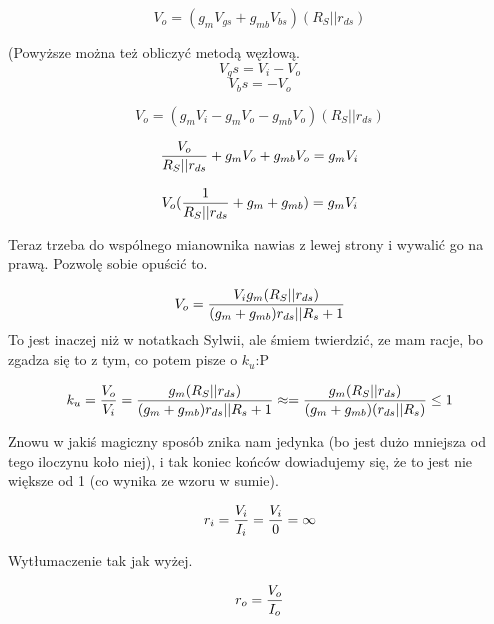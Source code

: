 \documentclass[10pt,a4paper]{article}
\begin{document}
\begin{equation}
V_o = {(g_mV_{gs} + g_{mb}V_{bs})(R_S || r_{ds})}
\end{equation}

(Powyższe można też obliczyć metodą węzłową.
\begin{equation}
V_gs = V_i - V_o
\end{equation}
\begin{equation}
V_bs = - V_o
\end{equation}

\begin{equation}
V_o = {(g_mV_i - g_mV_o - g_{mb}V_{o})(R_S || r_{ds})}
\end{equation}

\begin{equation}
{V_o \over R_S || r_{ds}} + g_mV_o + g_{mb}V_{o}= {g_mV_i }
\end{equation}

\begin{equation}
{V_o ({1\over R_S || r_{ds}} + g_m + g_{mb})= g_mV_i }
\end{equation}

Teraz trzeba do wspólnego mianownika nawias z lewej strony i wywalić go na prawą. Pozwolę sobie opuścić to. 

\begin{equation}
V_o = {V_ig_m(R_S || r_{ds}) \over (g_m + g_{mb})r_{ds}||R_s + 1}
\end{equation}
To jest inaczej niż w notatkach Sylwii, ale śmiem twierdzić, ze mam racje, bo zgadza się to z tym, co potem pisze o $k_u$:P

\begin{equation}
k_u = {V_o \over V_i} = {g_m(R_S || r_{ds}) \over (g_m + g_{mb})r_{ds}||R_s + 1} \approx = {g_m(R_S || r_{ds}) \over (g_m + g_{mb})(r_{ds}||R_s)} \leq 1
\end{equation}

Znowu w jakiś magiczny sposób znika nam jedynka (bo jest dużo mniejsza od tego iloczynu koło niej), i tak koniec końców dowiadujemy się, że to jest nie większe od 1 (co wynika ze wzoru w sumie).

\begin{equation}
r_i = {V_i \over I_i} = {V_i \over 0} = \infty
\end{equation}

Wytłumaczenie tak jak wyżej. 

\begin{equation}
r_o = {V_o \over I_o}
\end{equation}
\end{document}
